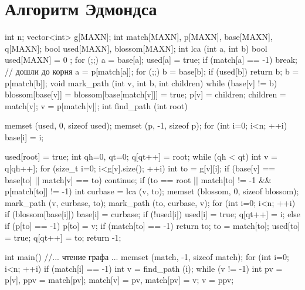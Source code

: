 \documentclass[12pt, titlepage]{article}
\begin{document}
\section{Алгоритм Эдмондса}
\begin{cppcode}
int n;
vector<int> g[MAXN];
int match[MAXN], p[MAXN], base[MAXN], q[MAXN];
bool used[MAXN], blossom[MAXN];
int lca (int a, int b) {
    bool used[MAXN] = { 0 };
    for (;;) {
        a = base[a];
        used[a] = true;
        if (match[a] == -1)  break; // дошли до корня
        a = p[match[a]];
    }
    for (;;) {
        b = base[b];
        if (used[b])  return b;
        b = p[match[b]];
    }
}
void mark_path (int v, int b, int children) {
    while (base[v] != b) {
        blossom[base[v]] = blossom[base[match[v]]] = true;
        p[v] = children;
        children = match[v];
        v = p[match[v]];
    }
}
int find_path (int root) {
    memset (used, 0, sizeof used);
    memset (p, -1, sizeof p);
    for (int i=0; i<n; ++i)
        base[i] = i;
 
    used[root] = true;
    int qh=0, qt=0;
    q[qt++] = root;
    while (qh < qt) {
        int v = q[qh++];
        for (size_t i=0; i<g[v].size(); ++i) {
            int to = g[v][i];
            if (base[v] == base[to] || match[v] == to)  continue;
            if (to == root || match[to] != -1 && p[match[to]] != -1) {
                int curbase = lca (v, to);
                memset (blossom, 0, sizeof blossom);
                mark_path (v, curbase, to);
                mark_path (to, curbase, v);
                for (int i=0; i<n; ++i)
                    if (blossom[base[i]]) {
                        base[i] = curbase;
                        if (!used[i]) {
                            used[i] = true;
                            q[qt++] = i;
                        }
                    }
            }
            else if (p[to] == -1) {
                p[to] = v;
                if (match[to] == -1)
                    return to;
                to = match[to];
                used[to] = true;
                q[qt++] = to;
            }
        }
    }
    return -1;
}
int main() {
    //... чтение графа ...
    memset (match, -1, sizeof match);
    for (int i=0; i<n; ++i)
        if (match[i] == -1) {
            int v = find_path (i);
            while (v != -1) {
                int pv = p[v],  ppv = match[pv];
                match[v] = pv,  match[pv] = v;
                v = ppv;
            }
        }
}
\end{cppcode}
\end{document}
